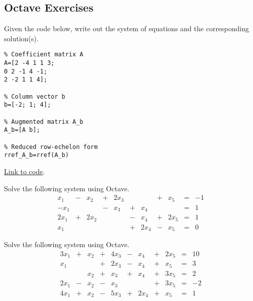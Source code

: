 \documentclass{ximera}
\begin{document}
\subsection*{Octave Exercises}

\begin{problem}\label{prob_oct_sys_0}
    Given the code below, write out the system of equations and the corresponding solution(s).

    \begin{verbatim}
% Coefficient matrix A
A=[2 -4 1 1 3;
0 2 -1 4 -1;
2 -2 1 1 4];

% Column vector b
b=[-2; 1; 4];

% Augmented matrix A_b
A_b=[A b];

% Reduced row-echelon form
rref_A_b=rref(A_b)
    \end{verbatim}

\href{https://sagecell.sagemath.org/?z=eJxFjcEKwjAQRO-B_MNcCnoI2NpbySH4B16LFJtuNNA0sKTq57sVVBaGGeaxU-GUKYToIy0F6Vo4vuC0crZvYFrUcsdOqwMk1mhFJIlvPlV7kaRVJV_mNS14kC-ZMWo12t40Heruz7j1lmSFpt_OIKCI7R3GL3WmafXCcH4a8nea84KQOWnFTGHY8M3sxOzf0oYzHQ==&lang=octave&interacts=eJyLjgUAARUAuQ==}{Link to code}.    
\end{problem}

\begin{problem}\label{prob_oct_sys_1}
 Solve the following system using Octave.
 \begin{equation}
    \begin{array}{ccccccccccc}
          x_1 &- &x_2&+&2x_3&&&+&x_5&= &-1 \\
         -x_1&&&-&x_3&+&x_4&&&=&1\\
         2x_1&+&2x_2&&&-&x_4&+&2x_5&=&1\\
         x_1&&&&&+&2x_4&-&x_5&=&0
        \end{array}
        \end{equation}   

\end{problem}

\begin{problem}\label{prob_oct_sys_2}
    Solve the following system using Octave.
    \begin{equation}
       \begin{array}{ccccccccccc}
             3x_1&+&x_2&+&4x_3&-&x_4&+&2x_5&= &10 \\
            x_1&&&+&2x_3&-&x_4&+&x_5&=&3\\
            &&x_2&+&x_3&+&x_4&+&3x_5&=&2\\
            2x_1&-&x_2&-&x_3&&&+&3x_5&=&-2\\
            4x_1&+&x_2&-&5x_3&+&2x_4&+&x_5&=&1
        \end{array}
    \end{equation}   
\end{problem}
\end{document}
